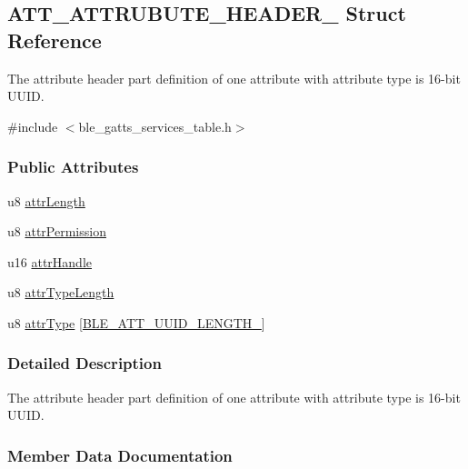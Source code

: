 \hypertarget{struct_a_t_t___a_t_t_r_u_b_u_t_e___h_e_a_d_e_r__2}{}\subsection{A\+T\+T\+\_\+\+A\+T\+T\+R\+U\+B\+U\+T\+E\+\_\+\+H\+E\+A\+D\+E\+R\+\_ Struct Reference}
\label{struct_a_t_t___a_t_t_r_u_b_u_t_e___h_e_a_d_e_r__2}


The attribute header part definition of one attribute with attribute type is 16-\/bit U\+U\+ID.  




{\ttfamily \#include $<$ble\+\_\+gatts\+\_\+services\+\_\+table.\+h$>$}

\subsubsection*{Public Attributes}
\begin{DoxyCompactItemize}
\item 
u8 \hyperlink{struct_a_t_t___a_t_t_r_u_b_u_t_e___h_e_a_d_e_r__2_a560b0ce4f159420488c66ea54d885d54}{attr\+Length}
\item 
u8 \hyperlink{struct_a_t_t___a_t_t_r_u_b_u_t_e___h_e_a_d_e_r__2_a29f7d808a6f01df5901f69c15ae2f0da}{attr\+Permission}
\item 
u16 \hyperlink{struct_a_t_t___a_t_t_r_u_b_u_t_e___h_e_a_d_e_r__2_a747a2d0aa9fb584742351afd61958c4f}{attr\+Handle}
\item 
u8 \hyperlink{struct_a_t_t___a_t_t_r_u_b_u_t_e___h_e_a_d_e_r__2_ab431c87312aa49c3a56bc687e311c70c}{attr\+Type\+Length}
\item 
u8 \hyperlink{struct_a_t_t___a_t_t_r_u_b_u_t_e___h_e_a_d_e_r__2_afe16e21cd13d9e06ee84b4ab62b43ba3}{attr\+Type} \mbox{[}\hyperlink{group___b_l_e___a_t_t___u_u_i_d___l_e_n_g_t_h___t_y_p_e_s_gad9197bbabd94416a4a41891fb808dcf1}{B\+L\+E\+\_\+\+A\+T\+T\+\_\+\+U\+U\+I\+D\+\_\+\+L\+E\+N\+G\+T\+H\+\_}\mbox{]}
\end{DoxyCompactItemize}


\subsubsection{Detailed Description}
The attribute header part definition of one attribute with attribute type is 16-\/bit U\+U\+ID. 

\subsubsection{Member Data Documentation}
